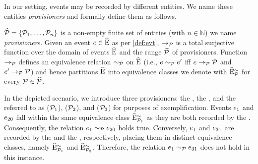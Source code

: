 \begin{newj}
In our setting, events may be recorded by different entities. We name these entities \emph{provisioners} and formally define them as follows.
\begin{definition}[Provisioner]\label{def:provisioner}
	$\widehat{\mathcal{P}} = \{ \mathcal{P}_1, \ldots, \mathcal{P}_n \}$ is a non-empty finite set of entities (with $n \in \mathbb{N}$) we name \emph{provisioner}s. 
	Given an event $e \in \widehat{\mathrm{E}}$ as per \cref{def:evt}, $\to_{\mathcal{P}}$ is a total surjective function over the domain of events $\widehat{\mathrm{E}}$ and the range $\widehat{\mathcal{P}}$ of provisioners. Function $\to_{\mathcal{P}}$ defines an equivalence relation $\sim_{\mathcal{P}}$ on $\widehat{\mathrm{E}}$ (i.e., $e \sim_{\mathcal{P}} e'$ iff $e \to_{\mathcal{P}} \mathcal{P}$ and $e' \to_{\mathcal{P}} \mathcal{P}$) and hence partitions $\widehat{\mathrm{E}}$ into equivalence classes we denote with $\widehat{\mathrm{E}}^{\sim}_{\mathcal{P}}$ for every $\mathcal{P} \in \widehat{\mathcal{P}}$.
\end{definition}
In the depicted scenario, we introduce three provisioners: the , the , and the   referred to as ($\mathcal{P}_1$), ($\mathcal{P}_2$), and ($\mathcal{P}_3$) for purposes of exemplification. Events $e_{1}$ and $e_{20}$ fall within the same equivalence class $\widehat{\mathrm{E}}^{\sim}_{\mathcal{P}_1}$ as they are both recorded by the . Consequently, the relation $e_1 \sim_{\mathcal{P}} e_{20}$ holds true. Conversely, $e_{1}$ and $e_{31}$ are recorded by the  and the , respectively, placing them in distinct equivalence classes, namely $\widehat{\mathrm{E}}^{\sim}_{\mathcal{P}_1}$ and $\widehat{\mathrm{E}}^{\sim}_{\mathcal{P}_3}$. Therefore, the relation $e_1 \sim_{\mathcal{P}} e_{31}$ does not hold in this instance.


\end{newj}
